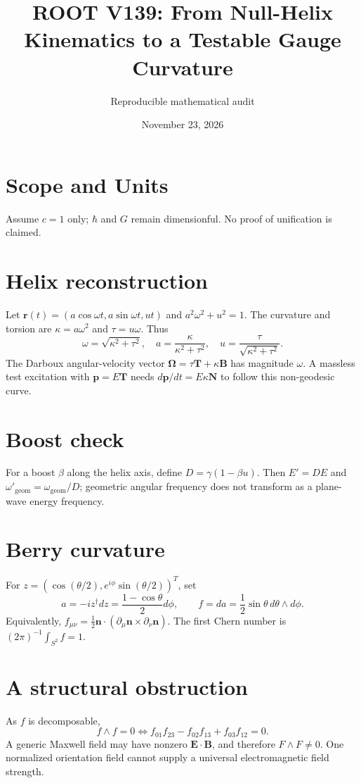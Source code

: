 \documentclass[11pt]{article}
\title{ROOT V139: From Null-Helix Kinematics to a Testable Gauge Curvature}
\author{Reproducible mathematical audit}
\date{November 23, 2026}
\begin{document}
\maketitle
\section{Scope and Units}
Assume $c=1$ only; $\hbar$ and $G$ remain dimensionful. No proof of unification is claimed.
\section{Helix reconstruction}
Let $\mathbf r(t)=(a\cos\omega t,a\sin\omega t,ut)$ and $a^2\omega^2+u^2=1$.
The curvature and torsion are $\kappa=a\omega^2$ and $\tau=u\omega$. Thus
\begin{equation}
\boxed{\omega=\sqrt{\kappa^2+\tau^2},\quad a=\frac{\kappa}{\kappa^2+\tau^2},\quad u=\frac{\tau}{\sqrt{\kappa^2+\tau^2}}.}
\end{equation}
The Darboux angular-velocity vector $\boldsymbol\Omega=\tau\mathbf T+\kappa\mathbf B$ has magnitude $\omega$.
A massless test excitation with $\mathbf p=E\mathbf T$ needs $d\mathbf p/dt=E\kappa\mathbf N$ to follow this non-geodesic curve.
\section{Boost check}
For a boost $\beta$ along the helix axis, define $D=\gamma(1-\beta u)$.
Then $E'=DE$ and $\omega'_{\mathrm{geom}}=\omega_{\mathrm{geom}}/D$; geometric angular frequency does not transform as a plane-wave energy frequency.
\section{Berry curvature}
For $z=(\cos(\theta/2),e^{i\phi}\sin(\theta/2))^T$, set
\begin{equation}
a=-i z^\dagger dz=\frac{1-\cos\theta}{2}d\phi,\qquad
f=da=\frac12\sin\theta\,d\theta\wedge d\phi.
\end{equation}
Equivalently, $f_{\mu\nu}=\frac12\mathbf n\cdot(\partial_\mu\mathbf n\times\partial_\nu\mathbf n)$.
The first Chern number is $(2\pi)^{-1}\int_{S^2}f=1$.
\section{A structural obstruction}
As $f$ is decomposable,
\begin{equation}
\boxed{f\wedge f=0\iff f_{01}f_{23}-f_{02}f_{13}+f_{03}f_{12}=0.}
\end{equation}
A generic Maxwell field may have nonzero $\mathbf E\cdot\mathbf B$, and therefore $F\wedge F\neq0$.
One normalized orientation field cannot supply a universal electromagnetic field strength.
\end{document}
